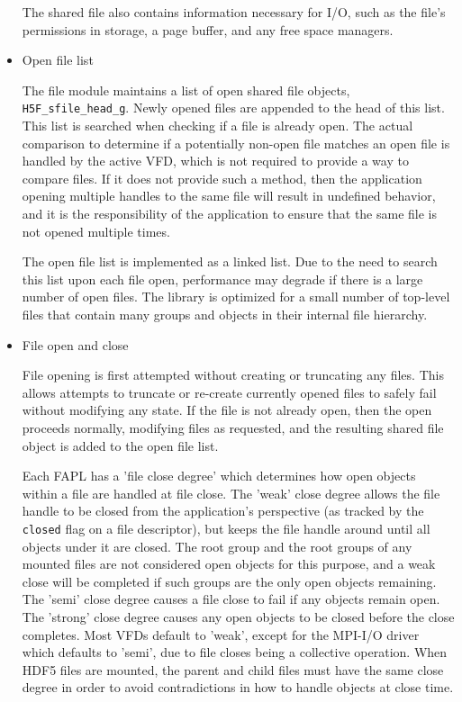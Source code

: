 \begin{itemize}
The shared file also contains information necessary for I/O, such as the file's permissions in storage, a page buffer, and any free space managers.

 \item Open file list

The file module maintains a list of open shared file objects, \texttt{H5F\_sfile\_head\_g}. Newly opened files are appended to the head of this list. This list is searched when checking if a file is already open. The actual comparison to determine if a potentially non-open file matches an open file is handled by the active VFD, which is not required to provide a way to compare files. If it does not provide such a method, then the application opening multiple handles to the same file will result in undefined behavior, and it is the responsibility of the application to ensure that the same file is not opened multiple times.

The open file list is implemented as a linked list. Due to the need to search this list upon each file open, performance may degrade if there is a large number of open files. The library is optimized for a small number of top-level files that contain many groups and objects in their internal file hierarchy.

    \item File open and close

File opening is first attempted without creating or truncating any files. This allows attempts to truncate or re-create currently opened files to safely fail without modifying any state. If the file is not already open, then the open proceeds normally, modifying files as requested, and the resulting shared file object is added to the open file list.

Each FAPL has a 'file close degree' which determines how open objects within a file are handled at file close. The 'weak' close degree allows the file handle to be closed from the application's perspective (as tracked by the \texttt{closed} flag on a file descriptor), but keeps the file handle around until all objects under it are closed. The root group and the root groups of any mounted files are not considered open objects for this purpose, and a weak close will be completed if such groups are the only open objects remaining. The 'semi' close degree causes a file close to fail if any objects remain open. The 'strong' close degree causes any open objects to be closed before the close completes. Most VFDs default to 'weak', except for the MPI-I/O driver which defaults to 'semi', due to file closes being a collective operation. When HDF5 files are mounted, the parent and child files must have the same close degree in order to avoid contradictions in how to handle objects at close time.


\end{itemize}
